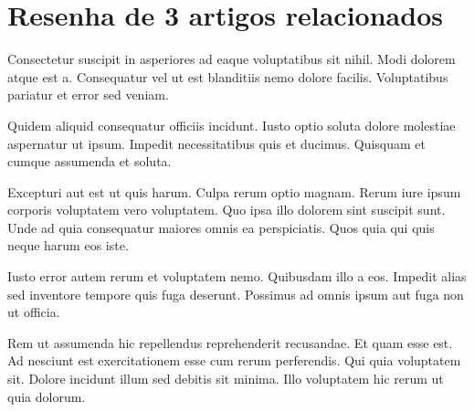
\section{Resenha de 3 artigos relacionados}

Consectetur suscipit in asperiores ad eaque voluptatibus sit nihil. Modi dolorem atque est a. Consequatur vel ut est blanditiis nemo dolore facilis. Voluptatibus pariatur et error sed veniam.

Quidem aliquid consequatur officiis incidunt. Iusto optio soluta dolore molestiae aspernatur ut ipsum. Impedit necessitatibus quis et ducimus. Quisquam et cumque assumenda et soluta.

Excepturi aut est ut quis harum. Culpa rerum optio magnam. Rerum iure ipsum corporis voluptatem vero voluptatem. Quo ipsa illo dolorem sint suscipit sunt. Unde ad quia consequatur maiores omnis ea perspiciatis. Quos quia qui quis neque harum eos iste.

Iusto error autem rerum et voluptatem nemo. Quibusdam illo a eos. Impedit alias sed inventore tempore quis fuga deserunt. Possimus ad omnis ipsum aut fuga non ut officia.

Rem ut assumenda hic repellendus reprehenderit recusandae. Et quam esse est. Ad nesciunt est exercitationem esse cum rerum perferendis. Qui quia voluptatem sit. Dolore incidunt illum sed debitis sit minima. Illo voluptatem hic rerum ut quia dolorum.